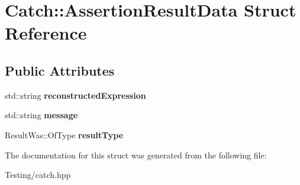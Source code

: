 \hypertarget{struct_catch_1_1_assertion_result_data}{\section{Catch\-:\-:Assertion\-Result\-Data Struct Reference}
\label{struct_catch_1_1_assertion_result_data}
}
\subsection*{Public Attributes}
\begin{DoxyCompactItemize}
\item 
\hypertarget{struct_catch_1_1_assertion_result_data_a9e809d36fffbeb1c7d0cbe7382dd9595}{std\-::string {\bfseries reconstructed\-Expression}}\label{struct_catch_1_1_assertion_result_data_a9e809d36fffbeb1c7d0cbe7382dd9595}

\item 
\hypertarget{struct_catch_1_1_assertion_result_data_ac34215803c4c4a88f795879f61c1f7b4}{std\-::string {\bfseries message}}\label{struct_catch_1_1_assertion_result_data_ac34215803c4c4a88f795879f61c1f7b4}

\item 
\hypertarget{struct_catch_1_1_assertion_result_data_a7ceab4a7ff722aec5587e3748caf66b7}{Result\-Was\-::\-Of\-Type {\bfseries result\-Type}}\label{struct_catch_1_1_assertion_result_data_a7ceab4a7ff722aec5587e3748caf66b7}

\end{DoxyCompactItemize}


The documentation for this struct was generated from the following file\-:\begin{DoxyCompactItemize}
\item 
Testing/catch.\-hpp\end{DoxyCompactItemize}
